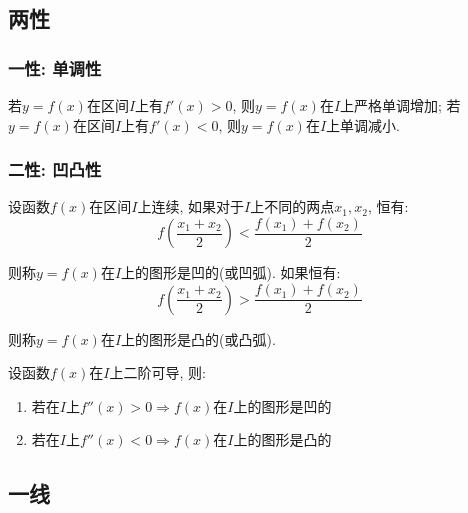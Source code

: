 \subsection{两性}
\subsubsection{一性: 单调性}
若$ y=f(x) $在区间$ I $上有$ f'(x)>0 $, 则$ y=f(x) $在$ I $上严格单调增加; 若$ y=f(x) $在区间$ I $上有$ f'(x)<0 $, 则$ y=f(x) $在$ I $上单调减小.
\subsubsection{二性: 凹凸性}
设函数$ f(x) $在区间$ I $上连续, 如果对于$ I $上不同的两点$ x_{1}, x_{2} $, 恒有:
\begin{equation*}
f(\frac{x_{1}+x_{2}}{2})<\frac{f(x_{1})+f(x_{2})}{2}
\end{equation*}\par
则称$ y=f(x) $在$ I $上的图形是凹的(或凹弧). 如果恒有:
\begin{equation*}
f(\frac{x_{1}+x_{2}}{2})>\frac{f(x_{1})+f(x_{2})}{2}
\end{equation*}\par
则称$ y=f(x) $在$ I $上的图形是凸的(或凸弧). \par \vspace{.5em}
 \par \vspace{.5em}
设函数$ f(x) $在$ I $上二阶可导, 则:
\begin{enumerate}
\item 若在$ I $上$ f''(x)>0\Rightarrow f(x) $在$ I $上的图形是凹的
\item 若在$ I $上$ f''(x)<0\Rightarrow f(x) $在$ I $上的图形是凸的
\end{enumerate}
\subsection{一线}
